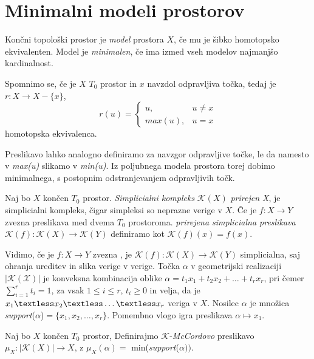 
\section{Minimalni modeli prostorov}

\begin{definicija}
    Končni topološki prostor je \textit{model} prostora $X$, če mu je šibko homotopsko ekvivalenten. Model je \textit{minimalen}, če ima izmed vseh modelov najmanjšo kardinalnost.
\end{definicija}

Spomnimo se, če je $X$ $T_0$ prostor in $x$ navzdol odpravljiva točka, tedaj je $r: X \rightarrow X - \{x\}$, $$
r(u) = \begin{cases}
    u, & u \neq x \\
    max(u), & u = x
\end{cases}$$
homotopska ekvivalenca.

Preslikavo lahko analogno definiramo za navzgor odpravljive točke, le da namesto v \textit{max(u)} slikamo v \textit{min(u)}. 
Iz poljubnega modela prostora torej dobimo minimalnega, s postopnim odstranjevanjem odpravljivih točk.


\begin{definicija}
    Naj bo $X$ končen $T_0$ prostor. \textit{Simplicialni kompleks} $\mathcal{K}(X)$ \textit{prirejen X}, je simplicialni kompleks, čigar simpleksi so neprazne verige v $X$. Če je $f: X\rightarrow Y$ zvezna preslikava med dvema $T_0$ prostoroma. \textit{prirejena simplicialna preslikava} $\mathcal{K}(f):\mathcal{K}(X) \rightarrow \mathcal{K}(Y)$ definiramo kot $\mathcal{K}(f)(x) = f(x)$.
\end{definicija}
Vidimo, če je $f: X\rightarrow Y$ zvezna , je $\mathcal{K}(f):\mathcal{K}(X) \rightarrow \mathcal{K}(Y)$ simplicialna, saj ohranja ureditev in slika verige v verige.
Točka $\alpha$ v geometrijski realizaciji $|\mathcal{K(X)}|$ je
konveksna kombinacija oblike
$\alpha = t_1x_1+t_2x_2 + \ldots + t_r x_r$, pri čemer 
$\sum_{i=1}^{r}t_i=1$, za vsak $1 \le i \le r$, $t_i \ge 0$ in 
velja, da je $x_1 \textless x_2 \textless \ldots \textless x_r$ veriga v $X$.
Nosilec $\alpha$ je množica \textit{support}($\alpha$)$= \{x_1,x_2,\ldots,x_r\}$. Pomembno vlogo igra 
 preslikava $\alpha \mapsto x_1$.
 
 \begin{definicija}
    Naj bo $X$ končen $T_0$ prostor, Definirajmo
    $\mathcal{K}$-\textit{McCordovo} preslikavo $\mu_X:|\mathcal{K}
    (X)|\rightarrow X$, z $\mu_X(\alpha) =$
    min(\textit{support}($\alpha))$.
\end{definicija}

